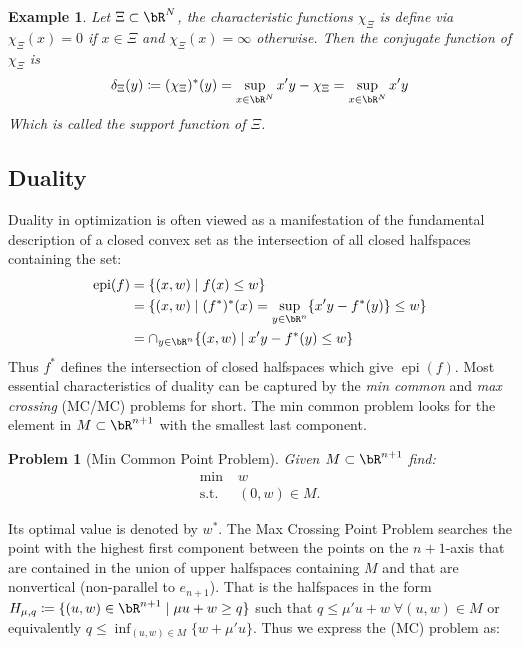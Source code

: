 \documentclass[11pt,a4paper,oneside,openany]{book}
\DeclareMathOperator{\epi}{epi}
\newtheorem{example}{Example}
\newtheorem{problem}{Problem}
\numberwithin{definition}{section}
\numberwithin{theorem}{section}
\numberwithin{problem}{section}
\begin{document}
\begin{example}\label{conjugate of characteristic function example}
    Let $\Xi \subset \bR^N$, the characteristic functions $\chi_{\Xi}$ is define via $\chi_{\Xi}(x) = 0$  if $x \in \Xi$ and $\chi_{\Xi}(x) = \infty$ otherwise.
    Then the conjugate function of $\chi_{\Xi}$ is 
    \[
    \delta_{\Xi}(y) \coloneqq (\chi_{\Xi})^*(y) = \sup_{x \in \bR^N} x'y - \chi_{\Xi} =  \sup_{x \in \bR^N} x'y
    \]
    Which is called the \emph{support function} of $\Xi$.
\end{example}

\subsection{Duality}
Duality in optimization is often viewed as a manifestation of the fundamental description of a closed convex set as the intersection of all closed halfspaces containing the set: 
\begin{align*}
    \epi(f) &= \{(x,w) \mid f(x) \leq w\} \\
           &= \{(x,w) \mid (f^*)^*(x) = \sup_{y \in \bR^n}\{x'y-f^*(y)\}\leq w\} \\
           &= \cap_{y \in \bR^n}\{(x,w) \mid x'y-f^*(y)\leq w\}
\end{align*}
Thus $f^*$ defines the intersection of closed halfspaces which give $\epi(f)$. Most essential characteristics of duality can be captured by the \emph{min common} and \emph{max crossing} (MC/MC) problems for short.
The min common problem looks for the element in $M \subset \bR^{n+1}$ with the smallest last component.

\begin{problem}[Min Common Point Problem]\label{min common problem}
    Given $M \subset \bR^{n+1}$ find:
    \begin{align}
        \min \;& w \\
        \text{s.t. }& (0,w) \in M.
    \end{align}
\end{problem}
Its optimal value is denoted by $w^*$. The Max Crossing Point Problem searches the point with the highest first component between the points on the $n+1$-axis that are contained in the union of upper halfspaces containing $M$ and that are nonvertical (non-parallel to $e_{n+1}$). That is the halfspaces in the form $H_{\mu,q} \coloneqq \{(u,w) \in \bR^{n+1}\mid \mu u + w \geq q\}$ such that $q \leq \mu'u +w \; \forall (u,w) \in M$ or equivalently $q \leq \inf_{(u,w) \in M}\{w + \mu'u\}$. Thus we express the (MC) problem as: 
\end{document}
